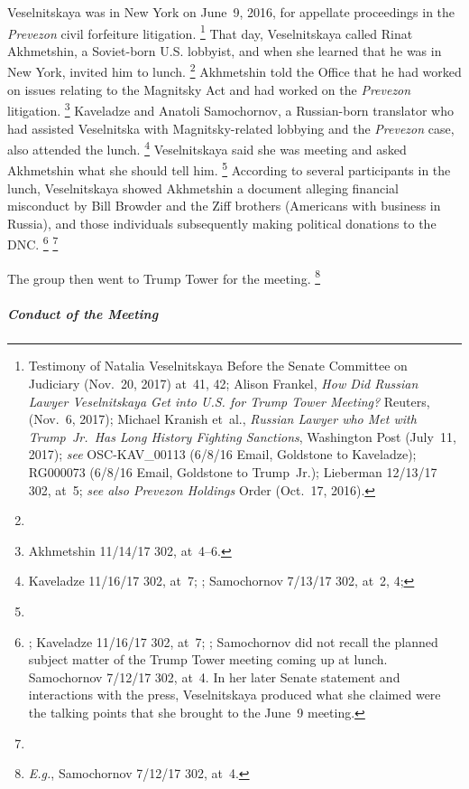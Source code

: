 Veselnitskaya was in New York on June~9, 2016, for appellate proceedings in the \textit{Prevezon} civil forfeiture litigation.%
\footnote{Testimony of Natalia Veselnitskaya Before the Senate Committee on Judiciary (Nov.~20, 2017) at~41, 42;
Alison Frankel, \textit{How Did Russian Lawyer Veselnitskaya Get into U.S. for Trump Tower Meeting?} Reuters, (Nov.~6, 2017);
Michael Kranish et~al., \textit{Russian Lawyer who Met with Trump~Jr.\ Has Long History Fighting Sanctions}, Washington Post (July~11, 2017);
\textit{see} OSC-KAV\_00113 (6/8/16 Email, Goldstone to Kaveladze);
RG000073 (6/8/16 Email, Goldstone to Trump~Jr.);
Lieberman 12/13/17 302, at~5;
\textit{see also Prevezon Holdings} Order (Oct.~17, 2016).}
That day, Veselnitskaya called Rinat Akhmetshin, a Soviet-born U.S. lobbyist,
and when she learned that he was in New York, invited him to lunch.%
\footnote{}
Akhmetshin told the Office that he had worked on issues relating to the Magnitsky Act and had worked on the \textit{Prevezon} litigation.%
\footnote{Akhmetshin 11/14/17 302, at~4--6. }
Kaveladze and Anatoli Samochornov, a Russian-born translator who had assisted Veselnitska with Magnitsky-related lobbying and the \textit{Prevezon} case, also attended the lunch.%
\footnote{Kaveladze 11/16/17 302, at~7;
;
Samochornov 7/13/17 302, at~2, 4;
}
 Veselnitskaya said she was meeting  and asked Akhmetshin what she should tell him.%
\footnote{}
According to several participants in the lunch, Veselnitskaya showed Akhmetshin a document alleging financial misconduct by Bill Browder and the Ziff brothers (Americans with business in Russia), and those individuals subsequently making political donations to the DNC\null.%
\footnote{;
Kaveladze 11/16/17 302, at~7;
;
Samochornov did not recall the planned subject matter of the Trump Tower meeting coming up at lunch.
 Samochornov 7/12/17 302, at~4.
In her later Senate statement and interactions with the press, Veselnitskaya produced what she claimed were the talking points that she brought to the June~9 meeting.}
\footnote{}

The group then went to Trump Tower for the meeting.%
\footnote{\textit{E.g.}, Samochornov 7/12/17 302, at~4.}

\subparagraph{Conduct of the Meeting}

